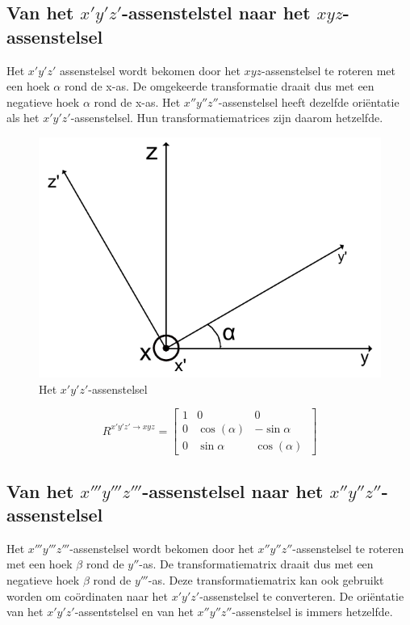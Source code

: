 
\subsection{Van het $x'y'z'$-assenstelstel naar het $xyz$-assenstelsel}
Het $x'y'z'$ assenstelsel wordt bekomen door het $xyz$-assenstelsel te roteren met een hoek $\alpha$ rond de x-as. De omgekeerde transformatie draait dus met een negatieve hoek $\alpha$ rond de x-as. Het $x''y''z''$-assenstelsel heeft dezelfde ori\"entatie als het $x'y'z'$-assenstelsel. Hun transformatiematrices zijn daarom hetzelfde.

\begin{figure}[H]
\centering
\includegraphics[scale=0.5]{x'y'z'.pdf}
\caption{Het $x'y'z'$-assenstelsel}
\end{figure}

\begin{equation*}
R^{x'y'z' \rightarrow xyz}=
  \begin{bmatrix}
    1 & 0 & 0\\
    0 & \cos(\alpha) & -\sin{\alpha}\\ 
    0 & \sin{\alpha} & \cos(\alpha)\
    \end{bmatrix}
\end{equation*}



\subsection{Van het $x'''y'''z'''$-assenstelsel naar het $x''y''z''$-assenstelsel}
Het $x'''y'''z'''$-assenstelsel wordt bekomen door het $x''y''z''$-assenstelsel te roteren met een hoek $\beta$ rond de $y''$-as. De transformatiematrix draait dus met een negatieve hoek $\beta$ rond de $y'''$-as. Deze transformatiematrix kan ook gebruikt worden om coördinaten naar het $x'y'z'$-assenstelsel te converteren. De ori\"entatie van het $x'y'z'$-assentstelsel en van het $x''y''z''$-assenstelsel is immers hetzelfde.


